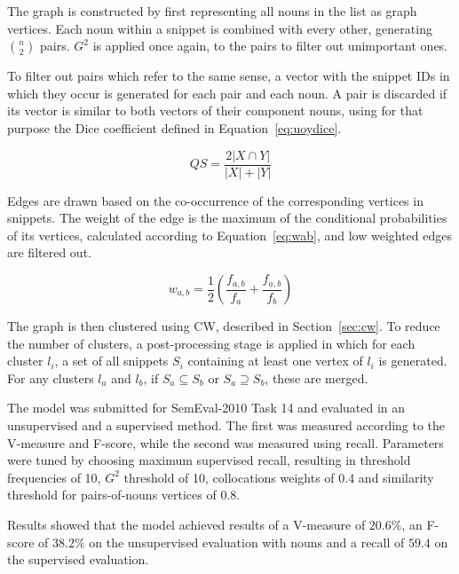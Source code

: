 The graph is constructed by first representing all nouns in the list as graph
vertices. Each noun within a snippet is combined with every other, generating
$\binom{n}{2}$ pairs. $G^2$ is applied once again, to the pairs to filter out
unimportant ones.

To filter out pairs which refer to the same sense, a vector with the snippet IDs
in which they occur is generated for each pair and each noun. A pair is
discarded if its vector is similar to both vectors of their component nouns,
using for that purpose the Dice coefficient defined in Equation~\ref{eq:uoydice}.

\begin{equation} \label{eq:uoydice}
 QS = \frac{2 |X \cap Y|}{|X| + |Y|}
\end{equation}

Edges are drawn based on the co-occurrence of the corresponding vertices in
snippets. The weight of the edge is the maximum of the conditional probabilities
of its vertices, calculated according to Equation~\ref{eq:wab}, and low weighted
edges are filtered out.

\begin{equation} \label{eq:wab}
 w_{a,b} = \frac{1}{2} \left( \frac{f_{a,b}}{f_a} + \frac{f_{a,b}}{f_b} \right)
\end{equation}

The graph is then clustered using \ac{CW}, described in Section~\ref{sec:cw}.
To reduce the number of clusters, a post-processing stage is applied in which
for each cluster $l_i$, a set of all snippets $S_i$ containing at least one
vertex of $l_i$ is generated. For any clusters $l_a$ and $l_b$, if
$S_a \subseteq S_b$  or $S_a \supseteq S_b$, these are merged.

The model was submitted for SemEval-2010 Task 14 \cite{manandhar2009semeval}
and evaluated in an unsupervised and a supervised method. The first was measured
according to the V-measure and F-score, while the second was measured using
recall. Parameters were tuned by choosing maximum supervised recall, resulting
in threshold frequencies of 10, $G^2$ threshold of 10, collocations weights of
0.4 and similarity threshold for pairs-of-nouns vertices of 0.8.

Results showed that the model achieved results of a V-measure of $20.6\%$, an
F-score of $38.2\%$ on the unsupervised evaluation with nouns and a recall of
$59.4$ on the supervised evaluation.

